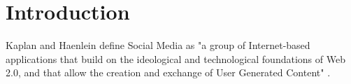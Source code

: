 \chapter{Introduction}
\label{cha:Chapter1_Introduction}

\iffalse

Total length: up to 5 Months = ~20 weeks oder
\selectlanguage{german}{

Abstract fertig machen, konkreter werden --> vor allem Methoden, kleiner Ansatz


Length: 1-2 pages
Inhaltsverzeichnis --> auch mehr Punkte

Methodology and Implementation --> kann man auch anders aufteilen
Motivation, Hintergrund

Warum diese Plattform --> einfache API

Auch aufpassen illegal

Wann schreiben? --> am Anfang, am Ende? Erstmal Entwurf am Ende
}
\selectlanguage{english}
%
%

\fi
Kaplan and Haenlein define Social Media as "a group of Internet-based applications that build on the ideological and technological foundations of Web 2.0, and that allow the creation and exchange of User Generated Content" \cite[p.~61]{KAPLAN201059}. 

